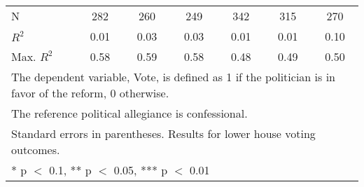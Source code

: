 \begin{table}[!h]
{\begin{tabular}[t]{lcccccc}
N & \num{282} & \num{260} & \num{249} & \num{342} & \num{315} & \num{270}\\
$R^2$ & \num{0.01} & \num{0.03} & \num{0.03} & \num{0.01} & \num{0.01} & \num{0.10}\\
Max. $R^2$ & \num{0.58} & \num{0.59} & \num{0.58} & \num{0.48} & \num{0.49} & \num{0.50}\\
\bottomrule
\multicolumn{7}{l}{\rule{0pt}{1em}The dependent variable, Vote, is defined as 1 if the politician is in favor of the reform, 0 otherwise.}\\
\multicolumn{7}{l}{\rule{0pt}{1em}The reference political allegiance is confessional.}\\
\multicolumn{7}{l}{\rule{0pt}{1em}Standard errors in parentheses. Results for lower house voting outcomes.}\\
\multicolumn{7}{l}{\rule{0pt}{1em}* p $<$ 0.1, ** p $<$ 0.05, *** p $<$ 0.01}\\
\end{tabular}}
\end{table}
